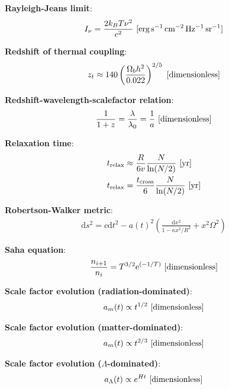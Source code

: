 \documentclass[a4paper,11pt]{article}
\begin{document}
{\noindent}\textbf{Rayleigh-Jeans limit}:
\begin{align*}
    I_\nu = \frac{2k_BT\nu^2}{c^2} ~ [{\rm erg\,s^{-1}\,cm^{-2}\,Hz^{-1}\,sr^{-1}}]
\end{align*}

{\noindent}\textbf{Redshift of thermal coupling}:
\begin{align*}
    z_t \approx 140\left(\frac{\Omega_bh^2}{0.022}\right)^{2/5} ~ [{\rm dimensionless}]
\end{align*}

{\noindent}\textbf{Redshift-wavelength-scalefactor relation}:
\begin{align*}
    \frac{1}{1+z} = \frac{\lambda}{\lambda_0} = \frac{1}{a} ~ [{\rm dimensionless}]
\end{align*}

{\noindent}\textbf{Relaxation time}:
\begin{align*}
    t_\mathrm{relax} &\approx \frac{R}{6v} \frac{N}{\ln(N/2)} ~ [{\rm yr}] \\
    t_\mathrm{relax} &= \frac{t_\mathrm{cross}}{6} \frac{N}{\ln(N/2)} ~ [{\rm yr}]
\end{align*}

{\noindent}\textbf{Robertson-Walker metric}:
\begin{align*}
    \mathrm{d}s^2 = c\mathrm{d}t^2 -a(t)^2 \left( \frac{\mathrm{d}x^2}{1-\kappa x^2/R^2} + x^2\Omega^2 \right)
\end{align*}

{\noindent}\textbf{Saha equation}:
\begin{align*}
    \frac{n_{i+1}}{n_i} = T^{3/2}\mathrm{e}^{(-1/T)} ~ [{\rm dimensionless}]
\end{align*}

{\noindent}\textbf{Scale factor evolution (radiation-dominated)}:
\begin{align*}
    a_m(t) \propto t^{1/2} ~ [{\rm dimensionless}]
\end{align*}

{\noindent}\textbf{Scale factor evolution (matter-dominated)}:
\begin{align*}
    a_m(t) \propto t^{2/3} ~ [{\rm dimensionless}]
\end{align*}

{\noindent}\textbf{Scale factor evolution ($\Lambda$-dominated)}:
\begin{align*}
    a_\Lambda(t) \propto e^{Ht} ~ [{\rm dimensionless}]
\end{align*}
\end{document}
